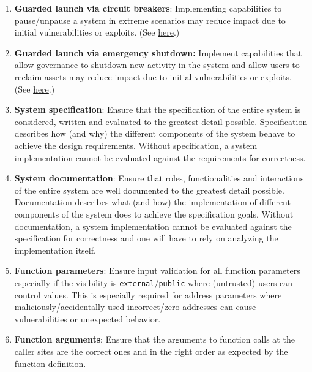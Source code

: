 \begin{enumerate}
\item\textbf{Guarded launch via circuit breakers}: Implementing capabilities to pause/unpause a system in extreme scenarios may reduce impact due to initial vulnerabilities or exploits. (See \href{https://medium.com/electric-capital/derisking-defi-guarded-launches-2600ce730e0a\#:~:text=Guarded%20Launches:%20Protecting%20Users%20with%20Limits\&text=A%20new%20contract%20is%20deployed,product%20in%20a%20limited%20scope.}{here}.)

\item\textbf{Guarded launch via emergency shutdown: }Implement capabilities that allow governance to shutdown new activity in the system and allow users to reclaim assets may reduce impact due to initial vulnerabilities or exploits. (See \href{https://medium.com/electric-capital/derisking-defi-guarded-launches-2600ce730e0a\#:~:text=Guarded%20Launches:%20Protecting%20Users%20with%20Limits\&text=A%20new%20contract%20is%20deployed,product%20in%20a%20limited%20scope.}{here}.)

\item\textbf{System specification}: Ensure that the specification of the entire system is considered, written and evaluated to the greatest detail possible. Specification describes how (and why) the different components of the system behave to achieve the design requirements. Without specification, a system implementation cannot be evaluated against the requirements for correctness.

\item\textbf{System documentation}: Ensure that roles, functionalities and interactions of the entire system are well documented to the greatest detail possible. Documentation describes what (and how) the implementation of different components of the system does to achieve the specification goals. Without documentation, a system implementation cannot be evaluated against the specification for correctness and one will have to rely on analyzing the implementation itself.

\item\textbf{Function parameters}: Ensure input validation for all function parameters especially if the visibility is \verb|external|/\verb|public| where (untrusted) users can control values. This is especially required for address parameters where maliciously/accidentally used incorrect/zero addresses can cause vulnerabilities or unexpected behavior.

\item\textbf{Function arguments}: Ensure that the arguments to function calls at the caller sites are the correct ones and in the right order as expected by the function definition.


\end{enumerate}
